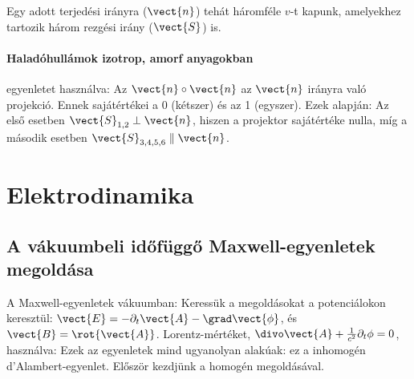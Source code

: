     Egy adott terjedési irányra ($\vect{n}$) tehát háromféle $v$-t kapunk, amelyekhez tartozik három rezgési irány ($\vect{S}$) is. 
    
   \paragraph{Haladóhullámok izotrop, amorf anyagokban}
    
     egyenletet használva:
    Az $\vect{n}\circ\vect{n}$ az $\vect{n}$ irányra való projekció.
   Ennek sajátértékei a 0 (kétszer) és az 1 (egyszer).
   Ezek alapján:
    Az első esetben $\vect{S}_{1,2}\perp\vect{n}$, hiszen a projektor sajátértéke nulla, míg a második esetben $\vect{S}_{3,4,5,6}\parallel\vect{n}$. 
    
 \section{Elektrodinamika}
  
  \subsection{A vákuumbeli időfüggő Maxwell-egyenletek megoldása}\label{ss:9-retpot}
   
   A Maxwell-egyenletek vákuumban:
   Keressük a megoldásokat a potenciálokon keresztül: $\vect{E}=-\partial_t\vect{A}-\grad\vect{\phi}$, és $\vect{B}=\rot{\vect{A}}$.
   Lorentz-mértéket, $\divo\vect{A}+\frac{1}{c^2}\partial_t\phi=0$, használva:
   Ezek az egyenletek mind ugyanolyan alakúak: ez a inhomogén d'Alambert-egyenlet.
   Először kezdjünk a homogén megoldásával. 
   
